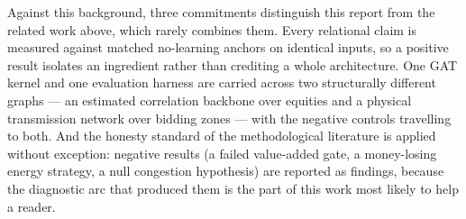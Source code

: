 Against this background, three commitments distinguish this report from
the related work above, which rarely combines them. Every relational
claim is measured against matched no-learning anchors on identical
inputs, so a positive result isolates an ingredient rather than
crediting a whole architecture. One GAT kernel and one evaluation
harness are carried across two structurally different graphs --- an
estimated correlation backbone over equities and a physical transmission
network over bidding zones --- with the negative controls travelling to
both. And the honesty standard of the methodological literature is
applied without exception: negative results (a failed value-added gate,
a money-losing energy strategy, a null congestion hypothesis) are
reported as findings, because the diagnostic arc that produced them is
the part of this work most likely to help a reader.
